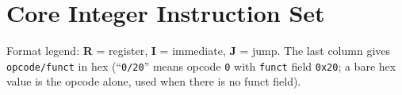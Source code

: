\documentclass[10pt]{article}
\newcommand{\op}[1]{\texttt{#1}}
\begin{document}
\begin{center}
\vspace{0.5cm}
\end{center}

\section{Core Integer Instruction Set}

Format legend: \textbf{R} = register, \textbf{I} = immediate, \textbf{J} =
jump. The last column gives \op{opcode/funct} in hex (``\op{0/20}'' means
opcode \op{0} with \op{funct} field \op{0x20}; a bare hex value is the
opcode alone, used when there is no funct field).
\end{document}
